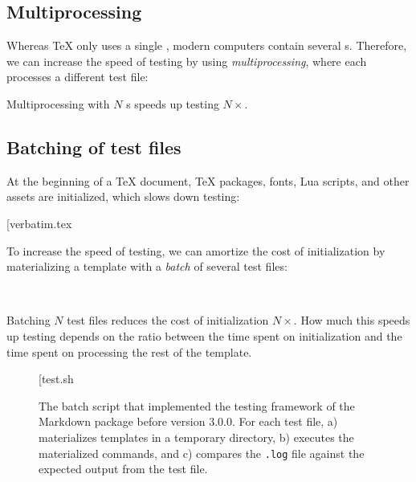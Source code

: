 \documentclass[final]{ltugboat}
\begin{document}
\subsection{Multiprocessing}
\label{sec:multiprocessing}
Whereas \TeX{} only uses a single , modern computers contain several s. Therefore, we can increase the speed of testing by using \emph{multiprocessing}, where each  processes a different test file:

\smallskip
\noindent
\begingroup
\centering

\par
\endgroup

\smallskip
\noindent
Multiprocessing with $N$ s speeds up testing $N\times$.

\subsection{Batching of test files}
\label{sec:batching-of-test-files}
At the beginning of a \TeX{} document, \TeX{} packages, fonts, Lua scripts, and other assets are initialized, which slows down testing:

\smallskip
\noindent
\example*[{verbatim.tex}

\smallskip

To increase the speed of testing, we can amortize the cost of initialization by materializing a template with a \emph{batch} of several test files:

\medskip
\noindent
{} \\

\smallskip
\noindent
Batching $N$ test files reduces the cost of initialization $N\times$. How much this speeds up testing depends on the ratio between the time spent on initialization and the time spent on processing the rest of the template.

\begin{figure}
\bigExample*[{test.sh}
\caption{The batch script  that implemented the testing framework of the Markdown package before version 3.0.0. For each test file,  a) materializes templates in a temporary directory, b) executes the materialized commands, and \linebreak c) compares the \texttt{.log} file against the expected output from the test file.}
\label{fig:test.sh}
\end{figure}
\end{document}

